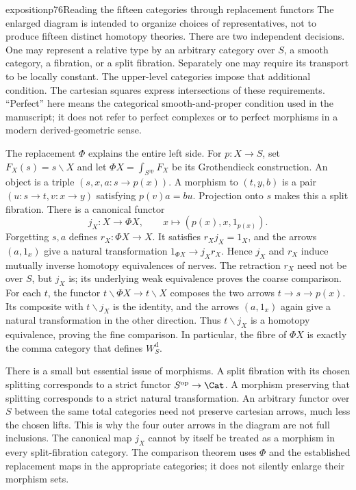 \begin{dcomment}{exposition}{p76}{Reading the fifteen categories through replacement functors}
The enlarged diagram is intended to organize choices of representatives, not to produce fifteen distinct homotopy theories. There are two independent decisions. One may represent a relative type by an arbitrary category over $S$, a smooth category, a fibration, or a split fibration. Separately one may require its transport to be locally constant. The upper-level categories impose that additional condition. The cartesian squares express intersections of these requirements. ``Perfect'' here means the categorical smooth-and-proper condition used in the manuscript; it does not refer to perfect complexes or to perfect morphisms in a modern derived-geometric sense.

The replacement $\Phi$ explains the entire left side. For $p:X\to S$, set $F_X(s)=s\backslash X$ and let $\Phi X=\int_{S^{\mathrm{op}}}F_X$ be its Grothendieck construction. An object is a triple $(s,x,a:s\to p(x))$. A morphism to $(t,y,b)$ is a pair $(u:s\to t,v:x\to y)$ satisfying $p(v)a=bu$. Projection onto $s$ makes this a split fibration. There is a canonical functor
\[
 j_X:X\longrightarrow\Phi X,\qquad
 x\longmapsto(p(x),x,1_{p(x)}).
\]
Forgetting $s,a$ defines $r_X:\Phi X\to X$. It satisfies $r_Xj_X=1_X$, and the arrows $(a,1_x)$ give a natural transformation $1_{\Phi X}\to j_Xr_X$. Hence $j_X$ and $r_X$ induce mutually inverse homotopy equivalences of nerves. The retraction $r_X$ need not be over $S$, but $j_X$ is; its underlying weak equivalence proves the coarse comparison. For each $t$, the functor $t\backslash\Phi X\to t\backslash X$ composes the two arrows $t\to s\to p(x)$. Its composite with $t\backslash j_X$ is the identity, and the arrows $(a,1_x)$ again give a natural transformation in the other direction. Thus $t\backslash j_X$ is a homotopy equivalence, proving the fine comparison. In particular, the fibre of $\Phi X$ is exactly the comma category that defines $W_S^{\mathrm d}$.

There is a small but essential issue of morphisms. A split fibration with its chosen splitting corresponds to a strict functor $S^{\mathrm{op}}\to\Cat$. A morphism preserving that splitting corresponds to a strict natural transformation. An arbitrary functor over $S$ between the same total categories need not preserve cartesian arrows, much less the chosen lifts. This is why the four outer arrows in the diagram are not full inclusions. The canonical map $j_X$ cannot by itself be treated as a morphism in every split-fibration category. The comparison theorem uses $\Phi$ and the established replacement maps in the appropriate categories; it does not silently enlarge their morphism sets.


\end{dcomment}
